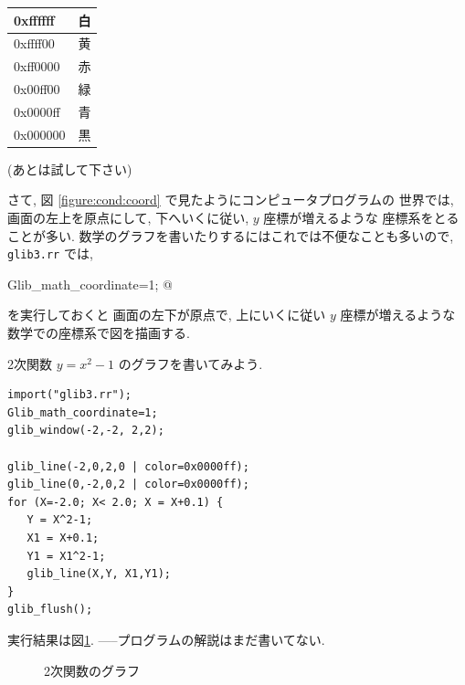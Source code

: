 \documentclass{jbook}
\begin{document}
\begin{tabular}{|l|l|}
\hline 
0xffffff  & 白 \\ \hline 
0xffff00  & 黄 \\ \hline
0xff0000  & 赤 \\ \hline
0x00ff00  & 緑 \\ \hline 
0x0000ff  & 青 \\ \hline 
0x000000  & 黒 \\ \hline 
\end{tabular}

\noindent
(あとは試して下さい)

さて, 図 \ref{figure:cond:coord} で見たようにコンピュータプログラムの
世界では, 画面の左上を原点にして, 下へいくに従い, $y$ 座標が増えるような
座標系をとることが多い.
数学のグラフを書いたりするにはこれでは不便なことも多いので,
{\tt glib3.rr} では,
\begin{center}
  \verb@ Glib_math_coordinate=1; @
\end{center}
を実行しておくと 
画面の左下が原点で, 上にいくに従い $y$ 座標が増えるような
数学での座標系で図を描画する.

\begin{example} \rm   {}
2次関数 $y=x^2-1$ のグラフを書いてみよう.
\begin{screen}
\begin{verbatim}
import("glib3.rr");
Glib_math_coordinate=1;
glib_window(-2,-2, 2,2);

glib_line(-2,0,2,0 | color=0x0000ff);
glib_line(0,-2,0,2 | color=0x0000ff);
for (X=-2.0; X< 2.0; X = X+0.1) {
   Y = X^2-1;
   X1 = X+0.1;
   Y1 = X1^2-1;
   glib_line(X,Y, X1,Y1);
}
glib_flush();
\end{verbatim}
\end{screen}
実行結果は図\ref{fig:graph2d}.
-----プログラムの解説はまだ書いてない.
\end{example}

\begin{figure}[tb]
\caption{2次関数のグラフ} \label{fig:graph2d}
\end{figure}
\end{document}
